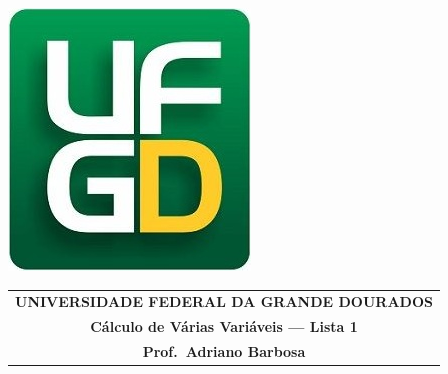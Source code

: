 \documentclass[a4paper,5pt]{amsbook}
\begin{document}
\thispagestyle{empty}
\pagestyle{empty}
\begin{minipage}[h]{0.14\textwidth}
	\includegraphics[scale=0.24]{../../ufgd.png}
\end{minipage}
\begin{minipage}[h]{\textwidth}
\begin{tabular}{c}
{{\bf UNIVERSIDADE FEDERAL DA GRANDE DOURADOS}}\\
{{\bf C\'alculo de V\'arias Vari\'aveis --- Lista 1}}\\
{{\bf Prof.\ Adriano Barbosa}}\\
\end{tabular}
\vspace{-0.45cm}
%
\end{minipage}

\end{document}
